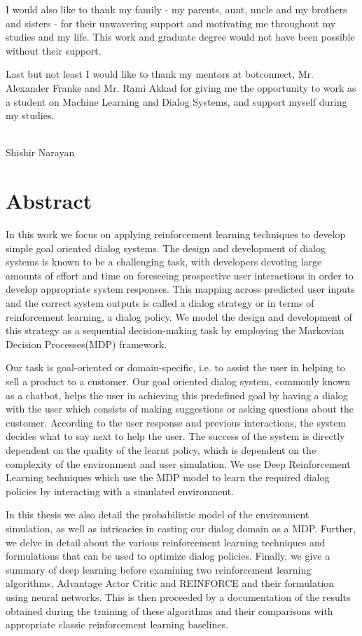 \documentclass[12pt]{extarticle}
\numberwithin{equation}{section}
\begin{document}
	I would also like to thank my family - my parents, aunt, uncle and my brothers and sisters - for their unwavering support and motivating me throughout my studies and my life. This work and graduate degree would not have been possible without their support.
	
	Last but not least I would like to thank my mentors at botconnect, Mr. Alexander Franke and Mr. Rami Akkad for giving me the opportunity to work as a student on Machine Learning and Dialog Systems, and support myself during my studies.
		\\\\
	\begin{flushright}
		Shishir Narayan\\
		\date{\today}
	\end{flushright}
	\clearpage
	
	\section*{Abstract}
	In this work we focus on applying reinforcement learning techniques to develop simple goal oriented dialog systems. The design and development of dialog systems is known to be a challenging task, with developers devoting  large amounts of effort and time on foreseeing prospective user interactions in order to develop appropriate system responses. This mapping across predicted user inputs and the correct system outputs is called a dialog strategy or in terms of reinforcement learning, a dialog policy. We model the design and development of this strategy as a sequential decision-making task by employing the Markovian Decision Processes(MDP) framework. 
	
	Our task is goal-oriented or domain-specific, i.e. to assist the user in helping to sell a product to a customer. Our goal oriented dialog system, commonly known as a chatbot, helps the user in achieving this predefined goal by having a dialog with the user which consists of making suggestions or asking questions about the customer. According to the user response and previous interactions, the system decides what to say next to help the user. The success of the system is directly dependent on the quality of the learnt policy, which is dependent on the complexity of the environment and user simulation. We use Deep Reinforcement Learning techniques which use the MDP model to learn the required dialog policies by interacting with a simulated environment. 
	
	In this thesis we also detail the probabilistic model of the environment simulation, as well as intricacies in casting our dialog domain as a MDP. Further, we delve in detail about the various reinforcement learning techniques and formulations that can be used to optimize dialog policies. Finally, we give a summary of deep learning before examining two reinforcement learning algorithms, Advantage Actor Critic and REINFORCE and their formulation using neural networks. This is then proceeded by a documentation of the results obtained during the training of these algorithms and their comparisons with appropriate classic reinforcement learning baselines. 
	\clearpage
	\tableofcontents
	
\end{document}
